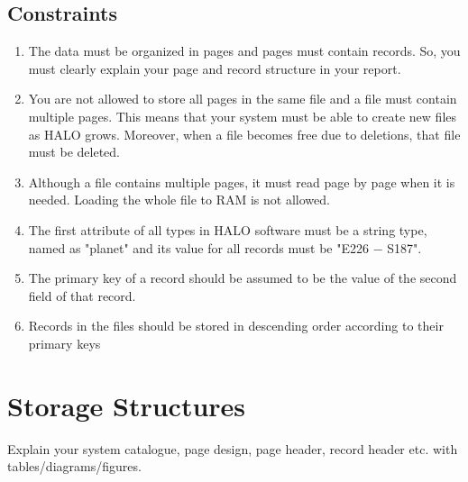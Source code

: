 \documentclass{article}
\begin{document}
\subsection{Constraints}
\begin{enumerate}
    \item The data must be organized in pages and pages must contain records. So, you must clearly explain your
page and record structure in your report.
    \item You are not allowed to store all pages in the
same file and a file must contain multiple pages. This means that your system must be able to create new files as HALO grows. Moreover, when a file becomes free
due to deletions, that file must be deleted.
    \item Although a file contains multiple pages, it must
read page by page when it is needed. Loading the whole
file to RAM is not allowed.
    \item The first attribute of all types in HALO software
must be a string type, named as "planet" and its value
for all records must be "E226 − S187".
    \item The primary key of a record should be assumed to
be the value of the second field of that record.
    \item Records in the files should be stored in
descending order according to their primary keys
     
\end{enumerate}

\section{Storage Structures}
\label{sec:structures}
Explain your system catalogue, page design, page header, record header etc. with tables/diagrams/figures. 
\end{document}
